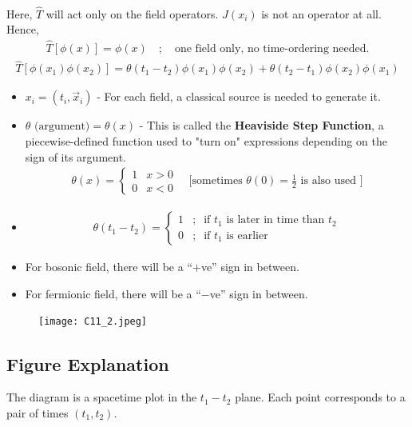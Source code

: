 \documentclass[14pt]{article} %
\begin{document}
{\begin{align*}
\end{align*}
Here, $\hat{T}$ will act only on the field operators. $J(x_i)$ is not an operator at all. Hence, 
\begin{align*}
\hat{T}[\phi(x)] = \phi(x) \quad ; \quad \text{one field only, no time-ordering needed.}
\end{align*}
\begin{align*}
\hat{T}[\phi(x_1)\phi(x_2)] = \theta(t_1 - t_2) \phi(x_1)\phi(x_2) + \theta(t_2 - t_1) \phi(x_2)\phi(x_1)
\end{align*}
\begin{tcolorbox}
\begin{itemize}
\item \(x_i = (t_i, \vec{x}_i)\) - For each field, a classical source is needed to generate it.
\item $\theta\text{ (argument)} = \theta(x)$ - This is called the \textbf{Heaviside Step Function}, a piecewise-defined function used to "turn on" expressions depending on the sign of its argument.
\begin{align*}
\theta(x) = \begin{cases}
1 & x > 0 \\
0 & x < 0
\end{cases}
\quad \big[\text{sometimes } \theta(0) = \frac{1}{2} \text{ is also used }\big]
\end{align*}
\item 
\begin{align*}
\theta(t_1 - t_2) = \begin{cases}
1 & ;~\text{ if } t_1 \text{ is later in time than } t_2 \\
0 & ;~\text{ if } t_1 \text{ is earlier}
\end{cases}
\end{align*}
\item For bosonic field, there will be a ``$+$ve'' sign in between.  
\item For fermionic field, there will be a ``$-$ve'' sign in between.
\end{itemize}
\end{tcolorbox}
\begin{figure}[H]
    \centering
    \texttt{[image: C11\_2.jpeg]}
    \caption*{}
\end{figure}
\vspace{-1cm}
\subsection*{Figure Explanation}
The diagram is a spacetime plot in the $t_1-t_2$ plane. Each point corresponds to a pair of times $(t_1, t_2)$.

}
\end{document}
